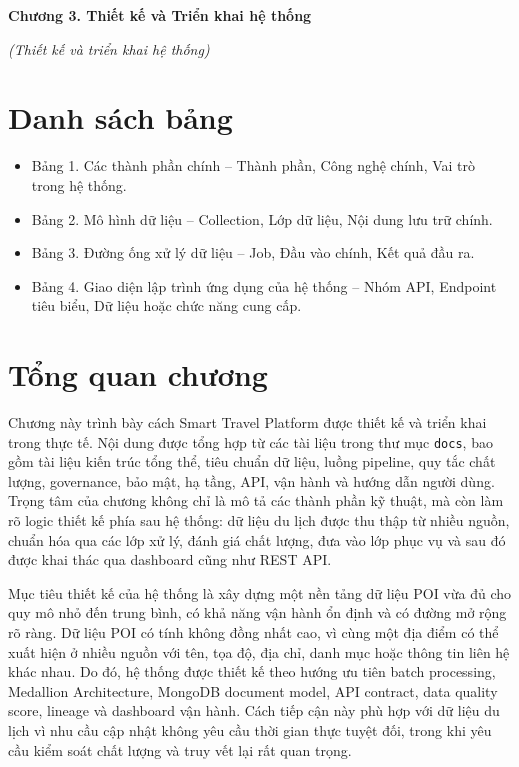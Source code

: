 \documentclass[12pt,a4paper]{article}
\begin{document}
\begin{center}
{\Large\bfseries Chương 3. Thiết kế và Triển khai hệ thống}

\vspace{0.3em}
{\large\itshape (Thiết kế và triển khai hệ thống)}
\end{center}

\section*{Danh sách bảng}

\begin{itemize}
  \item Bảng 1. Các thành phần chính -- Thành phần, Công nghệ chính, Vai trò trong hệ thống.
  \item Bảng 2. Mô hình dữ liệu -- Collection, Lớp dữ liệu, Nội dung lưu trữ chính.
  \item Bảng 3. Đường ống xử lý dữ liệu -- Job, Đầu vào chính, Kết quả đầu ra.
  \item Bảng 4. Giao diện lập trình ứng dụng của hệ thống -- Nhóm API, Endpoint tiêu biểu, Dữ liệu hoặc chức năng cung cấp.
\end{itemize}


\setcounter{section}{2}

\section{Tổng quan chương}

Chương này trình bày cách Smart Travel Platform được thiết kế và triển khai trong thực tế. Nội dung được tổng hợp từ các tài liệu trong thư mục \texttt{docs}, bao gồm tài liệu kiến trúc tổng thể, tiêu chuẩn dữ liệu, luồng pipeline, quy tắc chất lượng, governance, bảo mật, hạ tầng, API, vận hành và hướng dẫn người dùng. Trọng tâm của chương không chỉ là mô tả các thành phần kỹ thuật, mà còn làm rõ logic thiết kế phía sau hệ thống: dữ liệu du lịch được thu thập từ nhiều nguồn, chuẩn hóa qua các lớp xử lý, đánh giá chất lượng, đưa vào lớp phục vụ và sau đó được khai thác qua dashboard cũng như REST API.

Mục tiêu thiết kế của hệ thống là xây dựng một nền tảng dữ liệu POI vừa đủ cho quy mô nhỏ đến trung bình, có khả năng vận hành ổn định và có đường mở rộng rõ ràng. Dữ liệu POI có tính không đồng nhất cao, vì cùng một địa điểm có thể xuất hiện ở nhiều nguồn với tên, tọa độ, địa chỉ, danh mục hoặc thông tin liên hệ khác nhau. Do đó, hệ thống được thiết kế theo hướng ưu tiên batch processing, Medallion Architecture, MongoDB document model, API contract, data quality score, lineage và dashboard vận hành. Cách tiếp cận này phù hợp với dữ liệu du lịch vì nhu cầu cập nhật không yêu cầu thời gian thực tuyệt đối, trong khi yêu cầu kiểm soát chất lượng và truy vết lại rất quan trọng.
\end{document}
